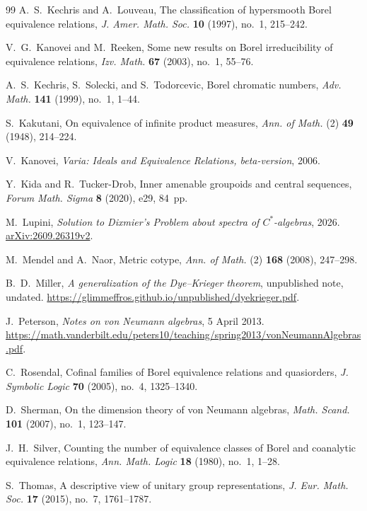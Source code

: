\documentclass[11pt]{article}
\numberwithin{equation}{section}
\theoremstyle{definition}
\begin{document}
\begin{thebibliography}{99}
A.~S.~Kechris and A.~Louveau,
The classification of hypersmooth Borel equivalence relations,
\emph{J. Amer. Math. Soc.} \textbf{10} (1997), no.~1, 215--242.

V.~G.~Kanovei and M.~Reeken,
Some new results on Borel irreducibility of equivalence relations,
\emph{Izv. Math.} \textbf{67} (2003), no.~1, 55--76.

A.~S.~Kechris, S.~Solecki, and S.~Todorcevic,
Borel chromatic numbers,
\emph{Adv. Math.} \textbf{141} (1999), no.~1, 1--44.

S.~Kakutani,
On equivalence of infinite product measures,
\emph{Ann. of Math.} (2) \textbf{49} (1948), 214--224.

V.~Kanovei, \emph{Varia: Ideals and Equivalence Relations,
beta-version}, 2006.

Y.~Kida and R.~Tucker-Drob,
Inner amenable groupoids and central sequences,
\emph{Forum Math. Sigma} \textbf{8} (2020), e29, 84~pp.

M.~Lupini,
\emph{Solution to Dixmier's Problem about spectra of $C^*$-algebras},
2026. \href{https://arxiv.org/abs/2609.26319v2}{arXiv:2609.26319v2}.

M.~Mendel and A.~Naor, Metric cotype,
\emph{Ann. of Math.} (2) \textbf{168} (2008), 247--298.

B.~D.~Miller,
\emph{A generalization of the Dye--Krieger theorem},
unpublished note, undated.
\url{https://glimmeffros.github.io/unpublished/dyekrieger.pdf}.

J.~Peterson, \emph{Notes on von Neumann algebras}, 5 April 2013.
\url{https://math.vanderbilt.edu/peters10/teaching/spring2013/vonNeumannAlgebras.pdf}.

C.~Rosendal,
Cofinal families of Borel equivalence relations and quasiorders,
\emph{J. Symbolic Logic} \textbf{70} (2005), no.~4, 1325--1340.

D.~Sherman, On the dimension theory of von Neumann algebras,
\emph{Math. Scand.} \textbf{101} (2007), no.~1, 123--147.

J.~H.~Silver,
Counting the number of equivalence classes of Borel and coanalytic
equivalence relations,
\emph{Ann. Math. Logic} \textbf{18} (1980), no.~1, 1--28.

S.~Thomas,
A descriptive view of unitary group representations,
\emph{J. Eur. Math. Soc.} \textbf{17} (2015), no.~7, 1761--1787.
\end{thebibliography}
\end{document}
